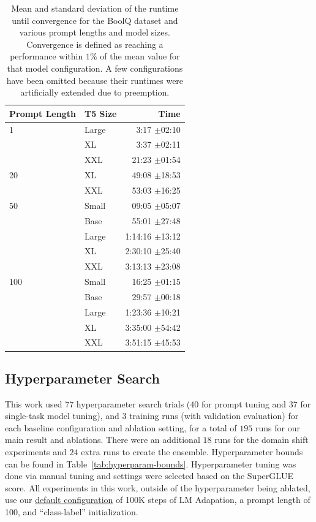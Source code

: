 \documentclass[11pt]{article}
\begin{document}
\begin{table}[t]
    \centering
    \footnotesize
    \begin{tabular}{l l| r}
    \toprule
    Prompt Length & T5 Size & Time \\
    \midrule
        1   & Large &    3:17 $\pm$02:10 \\
            & XL    &    3:37 $\pm$02:11 \\
            & XXL   &   21:23 $\pm$01:54 \\
        20  & XL    &   49:08 $\pm$18:53 \\
            & XXL   &   53:03 $\pm$16:25 \\
        50  & Small &   09:05 $\pm$05:07 \\
            & Base  &   55:01 $\pm$27:48 \\
            & Large & 1:14:16 $\pm$13:12 \\
            &  XL   & 2:30:10 $\pm$25:40 \\
            & XXL   & 3:13:13 $\pm$23:08 \\
        100 & Small &   16:25 $\pm$01:15 \\
            & Base  &   29:57 $\pm$00:18 \\        
            & Large & 1:23:36 $\pm$10:21 \\
            &  XL   & 3:35:00 $\pm$54:42 \\
            & XXL   & 3:51:15 $\pm$45:53 \\
    \bottomrule
    \end{tabular}
    \caption{Mean and standard deviation of the runtime until convergence for the BoolQ dataset and various prompt lengths and model sizes. Convergence is defined as reaching a performance within $1$\% of the mean value for that model configuration. A few configurations have been omitted because their runtimes were artificially extended due to preemption.}
    \label{tab:runtime}
\end{table}


\subsection{Hyperparameter Search}

This work used $77$ hyperparameter search trials ($40$ for prompt tuning and $37$ for single-task model tuning), and $3$ training runs (with validation evaluation) for each baseline configuration and ablation setting, for a total of $195$ runs for our main result and ablations. There were an additional $18$ runs for the domain shift experiments and $24$ extra runs to create the ensemble. Hyperparameter bounds can be found in Table~\ref{tab:hyperparam-bounds}. Hyperparameter tuning was done via manual tuning and settings were selected based on the SuperGLUE score. All experiments in this work, outside of the hyperparameter being ablated, use our \hyperref[settings:default]{default configuration} of 100K steps of LM Adapation, a prompt length of 100, and ``class-label'' initialization.
\end{document}

